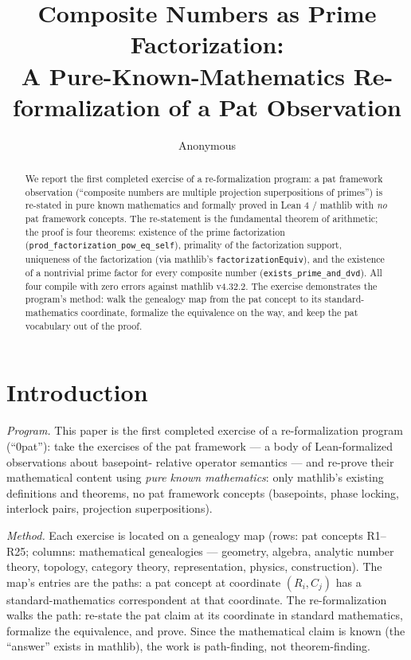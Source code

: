 \documentclass[sigplan,10pt,anonymous,review]{acmart}
\begin{document}
\title{Composite Numbers as Prime Factorization:\\ A Pure-Known-Mathematics
Re-formalization of a Pat Observation}

\author{Anonymous}

\begin{abstract}
We report the first completed exercise of a re-formalization program: a pat
framework observation (``composite numbers are multiple projection
superpositions of primes'') is re-stated in pure known mathematics and
formally proved in Lean 4 / mathlib with \emph{no} pat framework concepts.
The re-statement is the fundamental theorem of arithmetic; the proof is four
theorems: existence of the prime factorization
(\texttt{prod\_factorization\_pow\_eq\_self}), primality of the
factorization support, uniqueness of the factorization (via mathlib's
\texttt{factorizationEquiv}), and the existence of a nontrivial prime
factor for every composite number (\texttt{exists\_prime\_and\_dvd}). All
four compile with zero errors against mathlib v4.32.2. The exercise
demonstrates the program's method: walk the genealogy map from the pat
concept to its standard-mathematics coordinate, formalize the equivalence
on the way, and keep the pat vocabulary out of the proof.
\end{abstract}


\maketitle

\section{Introduction}

\emph{Program.} This paper is the first completed exercise of a
re-formalization program (``0pat''): take the exercises of the pat
framework --- a body of Lean-formalized observations about basepoint-
relative operator semantics --- and re-prove their mathematical content
using \emph{pure known mathematics}: only mathlib's existing definitions
and theorems, no pat framework concepts (basepoints, phase locking,
interlock pairs, projection superpositions).

\emph{Method.} Each exercise is located on a genealogy map (rows: pat
concepts R1--R25; columns: mathematical genealogies --- geometry, algebra,
analytic number theory, topology, category theory, representation,
physics, construction). The map's entries are the paths: a pat concept at
coordinate $(R_i, C_j)$ has a standard-mathematics correspondent at that
coordinate. The re-formalization walks the path: re-state the pat claim at
its coordinate in standard mathematics, formalize the equivalence, and
prove. Since the mathematical claim is known (the ``answer'' exists in
mathlib), the work is path-finding, not theorem-finding.
\end{document}
